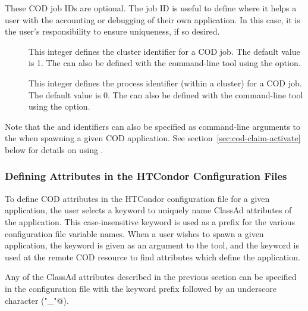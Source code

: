 These COD job IDs are optional.
The job ID is useful to define where it helps a
user with the accounting or debugging of their own application.
In this case, it is the user's responsibility to ensure uniqueness,
if so desired.
  
\begin{description}
 \item[] This integer defines the
   cluster identifier for a COD job.
   The default value is 1.
   The  can also be defined with the
     command-line tool using the 
   option.

 \item[]  This integer defines the
   process identifier (within a cluster) for a COD job.
   The default value is 0.
   The  can also be defined with the
     command-line tool using the 
   option.

\end{description}

Note that the  and  identifiers can 
also be specified as
command-line arguments to the   when
spawning a given COD application.
See section~\ref{sec:cod-claim-activate} below for details on using
 . 


\subsubsection{\label{sec:cod-config-attrs}
Defining Attributes in the HTCondor Configuration Files}


To define COD attributes in the HTCondor configuration file for a given
application, the user selects a keyword to uniquely name 
ClassAd attributes of the application.
This case-insensitive keyword is used as a prefix for the various
configuration file variable names.
When a user wishes to spawn a given application, the
keyword is given as an argument to the  tool, and the keyword
is used at the remote COD resource to find attributes which define the
application.

Any of the ClassAd attributes described in the previous section can be
specified in the configuration file with the keyword prefix followed
by an underscore character (\verb@"_"@).

